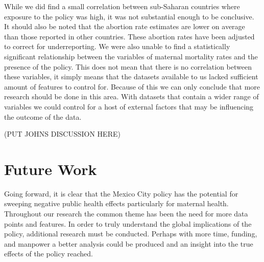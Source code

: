 \documentclass[11pt,]{article}
\begin{document}
While we did find a small correlation between sub-Saharan countries
where exposure to the policy was high, it was not substantial enough to
be conclusive. It should also be noted that the abortion rate estimates
are lower on average than those reported in other countries. These
abortion rates have been adjusted to correct for underreporting. We were
also unable to find a statistically significant relationship between the
variables of maternal mortality rates and the presence of the policy.
This does not mean that there is no correlation between these variables,
it simply means that the datasets available to us lacked sufficient
amount of features to control for. Because of this we can only conclude
that more research should be done in this area. With datasets that
contain a wider range of variables we could control for a host of
external factors that may be influencing the outcome of the data.

(PUT JOHNS DISCUSSION HERE)

\section{Future Work}\label{future-work}

Going forward, it is clear that the Mexico City policy has the potential
for sweeping negative public health effects particularly for maternal
health. Throughout our research the common theme has been the need for
more data points and features. In order to truly understand the global
implications of the policy, additional research must be conducted.
Perhaps with more time, funding, and manpower a better analysis could be
produced and an insight into the true effects of the policy reached.

\newpage
\singlespacing 
\end{document}
